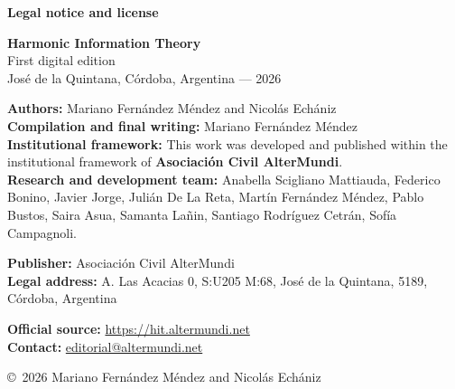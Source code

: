 \clearpage
\thispagestyle{empty}
\vspace*{0.025\textheight}
\begingroup
\setlength{\parskip}{0.22em}
\setlength{\parindent}{0pt}
\footnotesize
\raggedright
{}\textwidth
{}\textwidth

{\Large\bfseries Legal notice and license\par}
\vspace{0.22em}
\frontdivider[0.24\textwidth]

\vspace{0.4em}

{\par}
\textbf{Harmonic Information Theory}\\
First digital edition\\
Jos\'e de la Quintana, C\'ordoba, Argentina --- 2026

\vspace{0.22em}
{\par}
\textbf{Authors:} Mariano Fern\'andez M\'endez and Nicol\'as Ech\'aniz\\
\textbf{Compilation and final writing:} Mariano Fern\'andez M\'endez\\
\textbf{Institutional framework:} This work was developed and published within the institutional framework of \textbf{Asociaci\'on Civil AlterMundi}.\\
\textbf{Research and development team:} Anabella Scigliano Mattiauda, Federico Bonino, Javier Jorge, Juli\'an De La Reta, Mart\'in Fern\'andez M\'endez, Pablo Bustos, Saira Asua, Samanta La\~nin, Santiago Rodr\'iguez Cetr\'an, Sof\'ia Campagnoli.

\vspace{0.22em}
{\par}
\textbf{Publisher:} Asociaci\'on Civil AlterMundi\\
\textbf{Legal address:} A. Las Acacias 0, S:U205 M:68, Jos\'e de la Quintana, 5189, C\'ordoba, Argentina

\vspace{0.22em}
{\par}
\textbf{Official source:} \url{https://hit.altermundi.net}\\
\textbf{Contact:} \href{mailto:editorial@altermundi.net}{editorial@altermundi.net}

\vspace{0.22em}
\copyright\ 2026 Mariano Fern\'andez M\'endez and Nicol\'as Ech\'aniz


